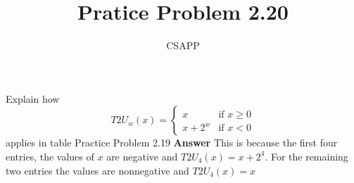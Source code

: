 \documentclass{article}
\title{Pratice Problem 2.20}
\author{CSAPP}
\begin{document}
    \maketitle
    \begin{flushleft}
        Explain how \\
        
        \[
        T2U_w(x) = \begin{cases} x & \text{if } x \geq 0 \\ x + 2^w & \text{if } x < 0 \end{cases}
        \] 
        applies in table Practice Problem 2.19
        \smallbreak
        \textbf{\small Answer}
            This is because the first four entries, the values of $x$
            are negative and $T2U_4(x) = x + 2^4$. For the remaining two entries 
            the values are nonnegative and $T2U_4(x) = x$
    \end{flushleft}
\end{document}
